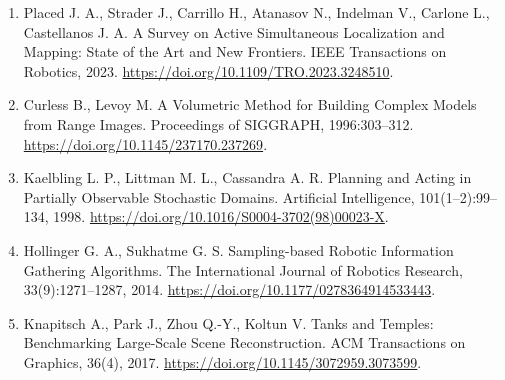\documentclass[11pt,a4paper]{article}
\numberwithin{equation}{section}
\begin{document}
\begin{enumerate}
\item
  Placed J. A., Strader J., Carrillo H., Atanasov N., Indelman V., Carlone L., Castellanos J. A. A Survey on Active Simultaneous Localization and Mapping: State of the Art and New Frontiers. IEEE Transactions on Robotics, 2023. \url{https://doi.org/10.1109/TRO.2023.3248510}.
\item
  Curless B., Levoy M. A Volumetric Method for Building Complex Models from Range Images. Proceedings of SIGGRAPH, 1996:303--312. \url{https://doi.org/10.1145/237170.237269}.
\item
  Kaelbling L. P., Littman M. L., Cassandra A. R. Planning and Acting in Partially Observable Stochastic Domains. Artificial Intelligence, 101(1--2):99--134, 1998. \url{https://doi.org/10.1016/S0004-3702(98)00023-X}.
\item
  Hollinger G. A., Sukhatme G. S. Sampling-based Robotic Information Gathering Algorithms. The International Journal of Robotics Research, 33(9):1271--1287, 2014. \url{https://doi.org/10.1177/0278364914533443}.
\item
  Knapitsch A., Park J., Zhou Q.-Y., Koltun V. Tanks and Temples: Benchmarking Large-Scale Scene Reconstruction. ACM Transactions on Graphics, 36(4), 2017. \url{https://doi.org/10.1145/3072959.3073599}.
\end{enumerate}
\endgroup
\end{document}
